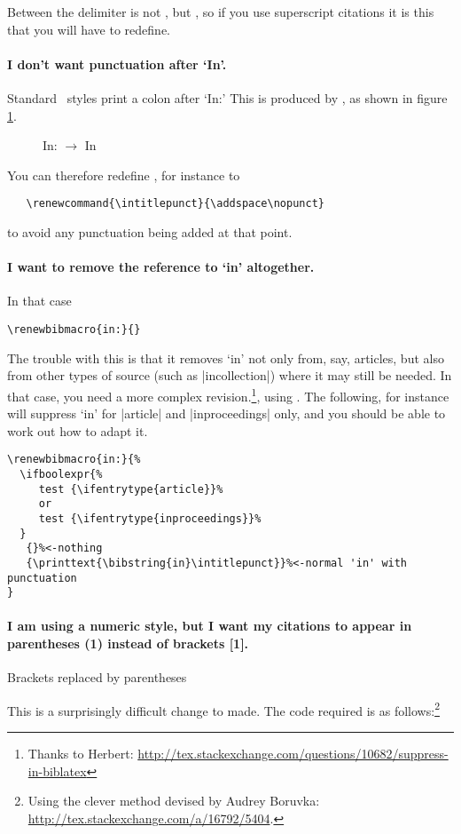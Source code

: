 Between  the delimiter is not
, but , so if you use
superscript citations it is this that you will have to redefine.

\paragraph{I don't want punctuation after `In'.} Standard \biblatex\
styles print a colon after `In:' This is produced by
, as shown in figure \ref{punctcite7}.
\begin{figure}
\caption{In: $\rightarrow$ In}\label{punctcite7}
\end{figure}

You can therefore redefine , for instance to
\begin{Verbatim}
   \renewcommand{\intitlepunct}{\addspace\nopunct}
\end{Verbatim}
to avoid any punctuation being added at that point.

\paragraph{I want to remove the reference to `in' altogether.}

In that case
\begin{verbatim}
\renewbibmacro{in:}{}
\end{verbatim}

The trouble with this is that it removes `in' not only from, say,
articles, but also from other types of source (such as |incollection|)
where it may still be needed. In that case, you need a more complex
revision.\footnote{Thanks to Herbert:
  \url{http://tex.stackexchange.com/questions/10682/suppress-in-biblatex}},
using \cs[\angled{type}]{ifentrytype}. The following, for instance will
suppress `in' for |article| and |inproceedings| only, and you should
be able to work out how to adapt it.
\begin{verbatim}
\renewbibmacro{in:}{%
  \ifboolexpr{%
     test {\ifentrytype{article}}%
     or
     test {\ifentrytype{inproceedings}}%
  }
   {}%<-nothing
   {\printtext{\bibstring{in}\intitlepunct}}%<-normal 'in' with punctuation
}
\end{verbatim}


\paragraph{I am using a numeric style, but I want my citations to
  appear in parentheses (1) instead of brackets
  [1].}\label{recipe:brackets}
\begin{marginfigure}[8ex]
\vspace{3pt}%
\caption{Brackets replaced by parentheses}\label{punctcite7}
\end{marginfigure}
This is a surprisingly difficult change to made. The code required is
as follows:\footnote{Using the clever method devised by Audrey
  Boruvka: \url{http://tex.stackexchange.com/a/16792/5404}.}

